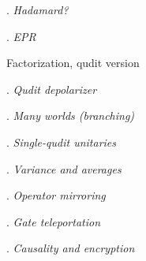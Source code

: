 \vspace{5pt}
\begin{Large}
  . \emph{Hadamard?}   %
\end{Large}
\vspace{5pt}

\vspace{5pt}
\begin{Large}
  . \emph{EPR} 
\end{Large}
\vspace{5pt}

\noindent Factorization, qudit version

\vspace{5pt}
\begin{Large}
  . \emph{Qudit depolarizer} 
\end{Large}
\vspace{5pt}

\vspace{5pt}
\begin{Large}
  . \emph{Many worlds (branching)} 
\end{Large}
\vspace{5pt}

\vspace{5pt}
\begin{Large}
  . \emph{Single-qudit unitaries} 
\end{Large}
\vspace{5pt}

\vspace{5pt}
\begin{Large}
  . \emph{Variance and averages} 
\end{Large}
\vspace{5pt}

\vspace{5pt}
\begin{Large}
  . \emph{Operator mirroring} 
\end{Large}
\vspace{5pt}

\vspace{5pt}
\begin{Large}
  . \emph{Gate teleportation} 
\end{Large}
\vspace{5pt}

\vspace{5pt}
\begin{Large}
  . \emph{Causality and encryption}  %
\end{Large}
\vspace{5pt}

